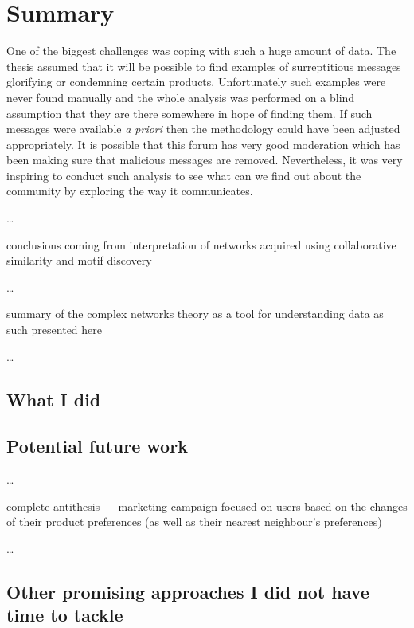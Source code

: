 \chapter{Summary}

  One of the biggest challenges was coping with such a huge amount of data. The thesis assumed that it will be possible to find examples of surreptitious messages glorifying or condemning certain products. Unfortunately such examples were never found manually and the whole analysis was performed on a blind assumption that they are there somewhere in hope of finding them. If such messages were available \emph{a priori} then the methodology could have been adjusted appropriately. It is possible that this forum has very good moderation which has been making sure that malicious messages are removed. Nevertheless, it was very inspiring to conduct such analysis to see what can we find out about the community by exploring the way it communicates.
  
  \ldots
  
  conclusions coming from interpretation of networks acquired using collaborative similarity and motif discovery
  
  \ldots
  
  summary of the complex networks theory as a tool for understanding data as such presented here
  
  \ldots


  \section{What I did}

  \section{Potential future work}
    
    \ldots
    
    complete antithesis --- marketing campaign focused on users based on the changes of their product preferences (as well as their nearest neighbour's preferences)
    
    \ldots

  \section{Other promising approaches I did not have time to tackle}
  
